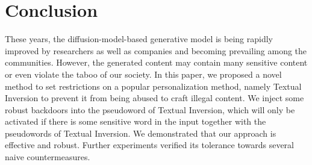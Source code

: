 \section{Conclusion}
\label{sec:Conclusion}
These years, the diffusion-model-based generative model is being rapidly improved by researchers as well as companies and becoming prevailing among the communities. However, the generated content may contain many sensitive content or even violate the taboo of our society. 
In this paper, we proposed a novel method to set restrictions on a popular personalization method, namely Textual Inversion to prevent it from being abused to craft illegal content. We inject some robust backdoors into the pseudoword of Textual Inversion, which will only be activated if there is some sensitive word in the input together with the pseudowords of Textual Inversion. We demonstrated that our approach is effective and robust. Further experiments verified its tolerance towards several naive countermeasures. 